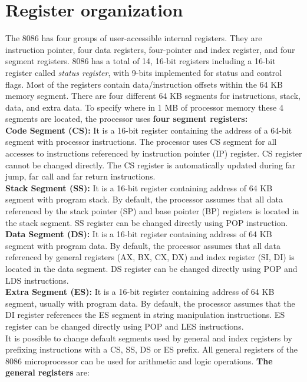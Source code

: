 \documentclass[12pt, a4paper]{scrartcl}
\begin{document}
\section{Register organization}
	The 8086 has four groups of user-accessible internal registers. They are instruction pointer, four data registers, four-pointer and index register, and four segment registers. 8086 has a total of 14, 16-bit registers including a 16-bit register called \textit{status register}, with 9-bits implemented for status and control flags. Most of the registers contain data/instruction offsets within the 64 KB memory segment. There are four different 64 KB segments for instructions, stack, data, and extra data. To specify where in 1 MB of processor memory these 4 segments are located, the processor uses \textbf{four segment registers:} \\
	
	\textbf{Code Segment (CS): }It is a 16-bit register containing the address of a 64-bit segment with processor instructions. The
	processor uses CS segment for all accesses to instructions
	referenced by instruction pointer (IP) register. CS register
	cannot be changed directly. The CS register is automatically updated during far jump, far call and far
	return instructions. \\
	
	\textbf{Stack Segment (SS): }It is a 16-bit register containing address of 64 KB segment with program stack. By default, the
	processor assumes that all data referenced by the stack	pointer (SP) and base pointer (BP) registers is located in
	the stack segment. SS register can be changed directly using POP instruction. \\
	
	\textbf{Data Segment (DS): }It is a 16-bit register containing address	of 64 KB segment with program data. By default, the
	processor assumes that all data referenced by general registers (AX, BX, CX, DX) and index register (SI, DI) is located in the data segment. DS register can be changed	directly using POP and LDS instructions. \\
	
	\textbf{Extra Segment (ES): }It is a 16-bit register containing address of 64 KB segment, usually with program data. By default,
	the processor assumes that the DI register references the
	ES segment in string manipulation instructions. ES register
	can be changed directly using POP and LES instructions. \\
	
	It is possible to change default segments used by general
	and index registers by prefixing instructions with a CS, SS,
	DS or ES prefix. All general registers of the 8086 microprocessor can be used for arithmetic and logic operations. \textbf{The general
		registers} are: \\
	
\end{document}
